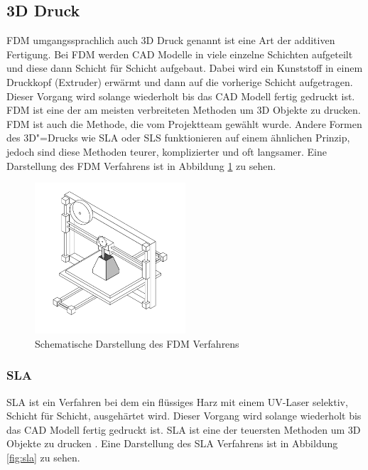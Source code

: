\subsection{3D Druck}
\label{sec:3d_druck}

\ac{FDM} umgangssprachlich auch 3D Druck genannt ist eine Art der additiven Fertigung. Bei \ac{FDM} werden \ac{CAD} Modelle in viele einzelne Schichten aufgeteilt und diese dann Schicht für Schicht aufgebaut. Dabei wird ein Kunststoff in einem Druckkopf (Extruder) erwärmt und dann auf die vorherige Schicht aufgetragen. Dieser Vorgang wird solange wiederholt bis das \ac{CAD} Modell fertig gedruckt ist. \ac{FDM} ist eine der am meisten verbreiteten Methoden um 3D Objekte zu drucken. \ac{FDM} ist auch die Methode, die vom Projektteam gewählt wurde. Andere Formen des 3D"=Drucks wie \ac{SLA} oder \ac{SLS} funktionieren auf einem ähnlichen Prinzip, jedoch sind diese Methoden teurer, komplizierter und oft langsamer. Eine Darstellung des \ac{FDM} Verfahrens ist in Abbildung \ref{fig:fdm} zu sehen.

\begin{figure}[H]
    \centering
    \includegraphics[width=0.5\textwidth]{images/fdm.png}
    \caption{Schematische Darstellung des \ac{FDM} Verfahrens }
    \label{fig:fdm}
\end{figure}

\subsubsection{\ac{SLA}}

\ac{SLA} ist ein Verfahren bei dem ein flüssiges Harz mit einem UV-Laser selektiv, Schicht für Schicht, ausgehärtet wird. Dieser Vorgang wird solange wiederholt bis das \ac{CAD} Modell fertig gedruckt ist. \ac{SLA} ist eine der teuersten Methoden um 3D Objekte zu drucken . Eine Darstellung des \ac{SLA} Verfahrens ist in Abbildung \ref{fig:sla} zu sehen.

